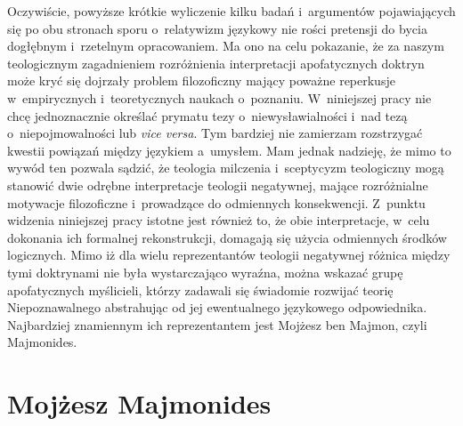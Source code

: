 Oczywiście, powyższe krótkie wyliczenie kilku badań i~argumentów pojawiających się po obu stronach sporu o~relatywizm językowy nie rości pretensji do bycia dogłębnym i~rzetelnym opracowaniem. Ma ono na celu pokazanie, że za naszym teologicznym zagadnieniem rozróżnienia interpretacji apofatycznych doktryn może kryć się dojrzały problem filozoficzny mający poważne reperkusje w~empirycznych i~teoretycznych naukach o~poznaniu. W~niniejszej pracy nie chcę jednoznacznie określać prymatu tezy o~niewysławialności i~nad tezą o~niepojmowalności lub \textit{vice versa}. Tym bardziej nie zamierzam rozstrzygać kwestii powiązań między językiem a~umysłem. Mam jednak nadzieję, że mimo to wywód ten pozwala sądzić, że teologia milczenia i~sceptycyzm teologiczny mogą stanowić dwie odrębne interpretacje teologii negatywnej, mające rozróżnialne motywacje filozoficzne i~prowadzące do odmiennych konsekwencji. Z~punktu widzenia niniejszej pracy istotne jest również to, że obie interpretacje, w~celu dokonania ich formalnej rekonstrukcji, domagają się użycia odmiennych środków logicznych. Mimo iż dla wielu reprezentantów teologii negatywnej różnica między tymi doktrynami nie była wystarczająco wyraźna, można wskazać grupę apofatycznych myślicieli, którzy zadawali się świadomie rozwijać teorię Niepoznawalnego abstrahując od jej ewentualnego językowego odpowiednika. Najbardziej znamiennym ich reprezentantem jest Mojżesz ben Majmon, czyli Majmonides.


\section{Mojżesz Majmonides}

